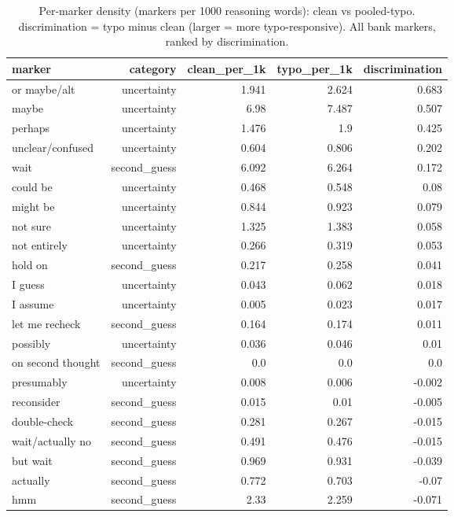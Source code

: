 \documentclass[11pt]{article}
\begin{document}
\begin{table}[H]
\centering
\caption{Per-marker density (markers per 1000 reasoning words): clean vs pooled-typo. discrimination = typo minus clean (larger = more typo-responsive). All bank markers, ranked by discrimination.}
\small
\begin{adjustbox}{max width=\textwidth}
\begin{tabular}{lrrrr}
\toprule
\textbf{marker} & \textbf{category} & \textbf{clean\_per\_1k} & \textbf{typo\_per\_1k} & \textbf{discrimination} \\
\midrule
or maybe/alt & uncertainty & 1.941 & 2.624 & 0.683 \\
maybe & uncertainty & 6.98 & 7.487 & 0.507 \\
perhaps & uncertainty & 1.476 & 1.9 & 0.425 \\
unclear/confused & uncertainty & 0.604 & 0.806 & 0.202 \\
wait & second\_guess & 6.092 & 6.264 & 0.172 \\
could be & uncertainty & 0.468 & 0.548 & 0.08 \\
might be & uncertainty & 0.844 & 0.923 & 0.079 \\
not sure & uncertainty & 1.325 & 1.383 & 0.058 \\
not entirely & uncertainty & 0.266 & 0.319 & 0.053 \\
hold on & second\_guess & 0.217 & 0.258 & 0.041 \\
I guess & uncertainty & 0.043 & 0.062 & 0.018 \\
I assume & uncertainty & 0.005 & 0.023 & 0.017 \\
let me recheck & second\_guess & 0.164 & 0.174 & 0.011 \\
possibly & uncertainty & 0.036 & 0.046 & 0.01 \\
on second thought & second\_guess & 0.0 & 0.0 & 0.0 \\
presumably & uncertainty & 0.008 & 0.006 & -0.002 \\
reconsider & second\_guess & 0.015 & 0.01 & -0.005 \\
double-check & second\_guess & 0.281 & 0.267 & -0.015 \\
wait/actually no & second\_guess & 0.491 & 0.476 & -0.015 \\
but wait & second\_guess & 0.969 & 0.931 & -0.039 \\
actually & second\_guess & 0.772 & 0.703 & -0.07 \\
hmm & second\_guess & 2.33 & 2.259 & -0.071 \\
\bottomrule
\end{tabular}
\end{adjustbox}
\end{table}
\end{document}
